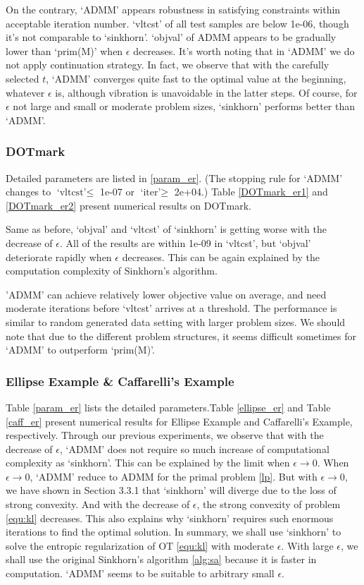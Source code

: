 On the contrary, `ADMM' appears robustness in satisfying constraints within acceptable iteration number. `vltcst' of all test samples are below 1e-06, though it's not comparable to `sinkhorn'. `objval' of ADMM appears to be gradually lower than `prim(M)' when $\epsilon$ decreases. It's worth noting that in `ADMM' we do not apply continuation strategy. In fact, we observe that with the carefully selected $t$, `ADMM' converges quite fast to the optimal value at the beginning, whatever $\epsilon$ is, although vibration is unavoidable in the latter steps. Of course, for $\epsilon$ not large and small or moderate problem sizes, `sinkhorn' performs better than `ADMM'.


\subsubsection{DOTmark}
Detailed parameters are listed in \ref{param_er}. (The stopping rule for `ADMM' changes to $\text{`vltcst'}\leqslant$ 1e-07 or $\text{`iter'}\geqslant$ 2e+04.) Table \ref{DOTmark_er1} and \ref{DOTmark_er2} present numerical results on DOTmark.



Same as before, `objval' and `vltcst' of `sinkhorn' is getting worse with the decrease of $\epsilon$. All of the results are within 1e-09 in `vltcst', but `objval' deteriorate rapidly when $\epsilon$ decreases. This can be again explained by the computation complexity of Sinkhorn's algorithm. 

'ADMM' can achieve relatively lower objective value on average, and need moderate iterations before `vltcst' arrives at a threshold. The performance is similar to random generated data setting with larger problem sizes. We should note that due to the different problem structures, it seems difficult sometimes for `ADMM' to outperform `prim(M)'.

\subsubsection{Ellipse Example \& Caffarelli's Example}


Table \ref{param_er} lists the detailed parameters.Table \ref{ellipse_er} and Table \ref{caff_er} present numerical results for Ellipse Example and Caffarelli's Example, respectively. Through our previous experiments, we observe that with the decrease of $\epsilon$, `ADMM' does not require so much increase of computational complexity as `sinkhorn'. This can be explained by the limit when $\epsilon\to0$. When $\epsilon\to0$, `ADMM' reduce to ADMM for the primal problem \ref{lp}. But with $\epsilon\to0$, we have shown in Section 3.3.1 that `sinkhorn' will diverge due to the loss of strong convexity. And with the decrease of $\epsilon$, the strong convexity of problem \ref{equ:kl} decreases. This also explains why `sinkhorn' requires such enormous iterations to find the optimal solution. In summary, we shall use `sinkhorn' to solve the entropic regularization of OT \ref{equ:kl} with moderate $\epsilon$. With large $\epsilon$, we shall use the original Sinkhorn's algorithm \ref{alg:sa} because it is faster in computation. `ADMM' seems to be suitable to arbitrary small $\epsilon$. 
